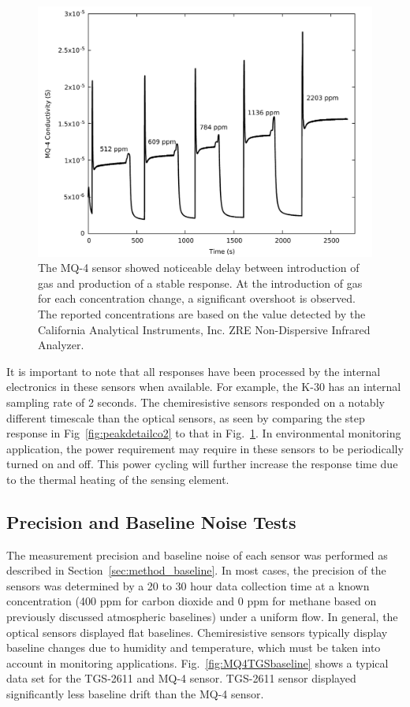\documentclass[times]{joehreview}
\begin{document}
	\begin{figure}[!t]
		\centering
		\includegraphics[width=\columnwidth]{honey6.pdf}
		\caption{The MQ-4 sensor showed noticeable delay between introduction of gas and production of a stable response.  At the introduction of gas for each concentration change, a significant overshoot is observed.  The reported concentrations are based on the value detected by the California Analytical Instruments, Inc. ZRE Non-Dispersive Infrared Analyzer.}
		\label{fig:mq4step}
	\end{figure}
	
	It is important to note that all responses have been processed by the internal electronics in these sensors when available.  For example, the K-30 has an internal sampling rate of 2 seconds.  The chemiresistive sensors responded on a notably different timescale than the optical sensors, as seen by comparing the step response in Fig~\ref{fig:peakdetailco2} to that in Fig.~\ref{fig:mq4step}.  In environmental monitoring application, the power requirement may require in these sensors to be periodically turned on and off.  This power cycling will further increase the response time due to the thermal heating of the sensing element.  
	
	
	\subsection{Precision and Baseline Noise Tests}
	\label{sec:main_baseline}
	The measurement precision and baseline noise of each sensor was performed as described in Section~\ref{sec:method_baseline}.  In most cases, the precision of the sensors was determined by a 20 to 30 hour data collection time at a known concentration (400 ppm for carbon dioxide and 0 ppm for methane based on previously discussed atmospheric baselines) under a uniform flow.  In general, the optical sensors displayed flat baselines. Chemiresistive sensors typically display baseline changes due to humidity and temperature, which must be taken into account in monitoring applications. Fig.~\ref{fig:MQ4TGSbaseline} shows a typical data set for the TGS-2611 and MQ-4 sensor.  TGS-2611 sensor displayed significantly less baseline drift than the MQ-4 sensor.
	
\end{document}
